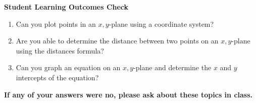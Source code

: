 \noindent \textbf{Student Learning Outcomes Check}

\begin{enumerate}
\item Can you plot points in an $x,y$-plane using a coordinate system?\\
\item Are you able to determine the distance between two points on an $x,y$-plane using the distances formula?\\
\item Can you graph an equation on an $x,y$-plane and determine the $x$ and $y$ intercepts of the equation?
\end{enumerate}

\noindent \textbf{If any of your answers were no, please ask about these topics in class.}


